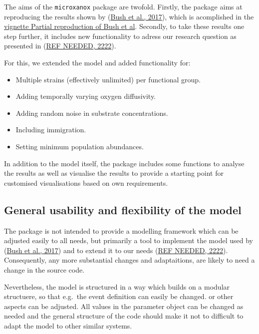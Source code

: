 \documentclass[]{elsarticle} %
\providecommand{\tightlist}{%
  \setlength{\itemsep}{0pt}\setlength{\parskip}{0pt}}
\begin{document}
The aims of the \texttt{microxanox} package are twofold. Firstly, the
package aims at reproducing the results shown by
(\protect\hyperlink{ref-Bush2017}{Bush et al., 2017}), which is
acomplished in the \href{LINK\%20NEEDED}{vignette Partial reproduction
of Bush et al}. Secondly, to take these results one step further, it
includes new functionality to adress our research question as presented
in (\protect\hyperlink{ref-REF_NEEDED}{REF NEEDED, 2222}).

For this, we extended the model and added functionality for:

\begin{itemize}
\tightlist
\item
  Multiple strains (effectively unlimited) per functional group.
\item
  Adding temporally varying oxygen diffusivity.
\item
  Adding random noise in substrate concentrations.
\item
  Including immigration.
\item
  Setting minimum population abundances.
\end{itemize}

In addition to the model itself, the package includes some functions to
analyse the results as well as visualise the results to provide a
starting point for customised visualisations based on own requirements.

\hypertarget{general-usability-and-flexibility-of-the-model}{%
\subsection{General usability and flexibility of the
model}\label{general-usability-and-flexibility-of-the-model}}

The package is not intended to provide a modelling framework which can
be adjusted easily to all needs, but primarily a tool to implement the
model used by (\protect\hyperlink{ref-Bush2017}{Bush et al., 2017}) and
to extend it to our needs (\protect\hyperlink{ref-REF_NEEDED}{REF
NEEDED, 2222}). Consequently, any more substantial changes and
adaptaitions, are likely to need a change in the source code.

Nevertheless, the model is structured in a way which builds on a modular
structuere, so that e.g.~the event definition can easily be changed. or
other aspects can be adjusted. All values in the parameter object can be
changed as needed and the general structure of the code should make it
not to difficult to adapt the model to other similar systems.
\end{document}
